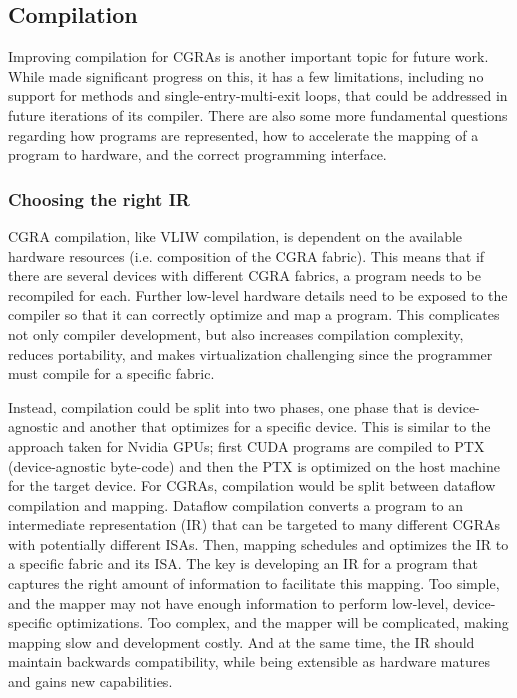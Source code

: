 \subsection{Compilation}
Improving compilation for CGRAs is another important topic for future work.
% 
While \riptide made significant progress on this, it has a few limitations, including no support for methods and single-entry-multi-exit loops, that could be addressed in future iterations of its compiler.
% 
There are also some more fundamental questions regarding how programs are represented, how to accelerate the mapping of a program to hardware, and the correct programming interface.

\subsubsection{Choosing the right IR}
CGRA compilation, like VLIW compilation, is dependent on the available hardware resources (i.e. composition of the CGRA fabric).
% 
% 
This means that if there are several devices with different CGRA fabrics, a program needs to be recompiled for each.
% 
Further low-level hardware details need to be exposed to the compiler so that it can correctly optimize and map a program.
% 
This complicates not only compiler development, but also increases compilation complexity, reduces portability, and makes virtualization challenging since the programmer must compile for a specific fabric.

Instead, compilation could be split into two phases, one phase that is device-agnostic and another that optimizes for a specific device.
% 
This is similar to the approach taken for Nvidia GPUs; first CUDA programs are compiled to PTX~\cite{ptx} (device-agnostic byte-code) and then the PTX is optimized on the host machine for the target device.
% 
For CGRAs, compilation would be split between dataflow compilation and mapping.
% 
Dataflow compilation converts a program to an intermediate representation (IR) that can be targeted to many different CGRAs with potentially different ISAs.
% 
Then, mapping schedules and optimizes the IR to a specific fabric and its ISA.
% 
The key is developing an IR for a program that captures the right amount of information to facilitate this mapping.
% 
Too simple, and the mapper may not have enough information to perform low-level, device-specific optimizations.
% 
Too complex, and the mapper will be complicated, making mapping slow and development costly.
%
And at the same time, the IR should maintain backwards compatibility, while being extensible as hardware matures and gains new capabilities.
% 

